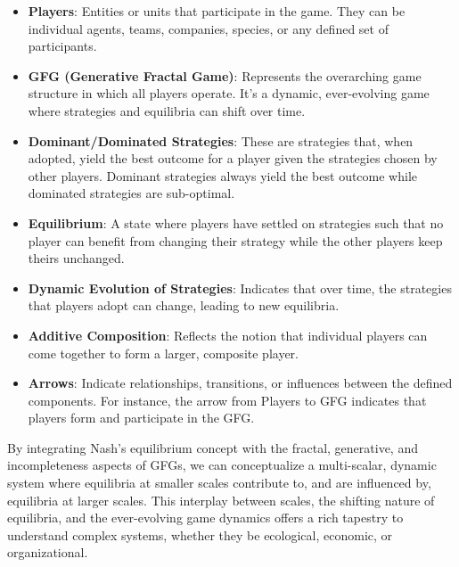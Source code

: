 \documentclass{article}
\begin{document}
\begin{itemize}
    \item \textbf{Players}: Entities or units that participate in the game. They can be individual agents, teams, companies, species, or any defined set of participants.
    
    \item \textbf{GFG (Generative Fractal Game)}: Represents the overarching game structure in which all players operate. It's a dynamic, ever-evolving game where strategies and equilibria can shift over time. 
    
    \item \textbf{Dominant/Dominated Strategies}: These are strategies that, when adopted, yield the best outcome for a player given the strategies chosen by other players. Dominant strategies always yield the best outcome while dominated strategies are sub-optimal.
    
    \item \textbf{Equilibrium}: A state where players have settled on strategies such that no player can benefit from changing their strategy while the other players keep theirs unchanged.
    
    \item \textbf{Dynamic Evolution of Strategies}: Indicates that over time, the strategies that players adopt can change, leading to new equilibria.
    
    \item \textbf{Additive Composition}: Reflects the notion that individual players can come together to form a larger, composite player.
    
    \item \textbf{Arrows}: Indicate relationships, transitions, or influences between the defined components. For instance, the arrow from Players to GFG indicates that players form and participate in the GFG.
\end{itemize}

\bigskip

By integrating Nash's equilibrium concept with the fractal, generative, and incompleteness aspects of GFGs, we can conceptualize a multi-scalar, dynamic system where equilibria at smaller scales contribute to, and are influenced by, equilibria at larger scales. This interplay between scales, the shifting nature of equilibria, and the ever-evolving game dynamics offers a rich tapestry to understand complex systems, whether they be ecological, economic, or organizational.

\end{document}
